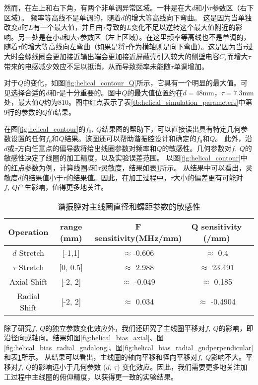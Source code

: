 然而，在左上和右下角，有两个非单调异常区域。一种是在大$d$和小$\tau$参数区（右下区域）。
频率等高线不是单调的，随着$d$的增大等高线向下弯曲。
这是因为当单独改变$d$时$L$有一个最大值，并且由$\tau$导致的$L$变化不足以逆转这个最大值附近的影响。另一处是在小$d$和大$\tau$参数区（左上区域）。在这里频率等高线也不是单调的，随着$\tau$的增大等高线向左弯曲（如果是将$\tau$作为横轴则是向下弯曲）。这是因为当$\tau$过大时会螺线圈会更加接近输出端会更加接近屏蔽壳引入较大的侧壁电容$C_s$而增大$\tau$带来的电感减少效应不足以抵消，从而导致频率未能随$\tau$单调增加。

对于$Q$的变化，如图\ref{fig:helical_contour_Q}所示，它具有一个明显的最大值。可见选择合适的$d$和$\tau$是十分重要的。图中$Q$的最大值位置约在$d=48$mm，$\tau=7.3$mm处，最大值$Q$约为$810$。图中红点表示了表\ref{tb:helical_simulation_parameters}中第9行的参数的$Q$值结果。

在图\ref{fig:helical_contour}的$ f_0,\ Q $结果图的帮助下，可以直接读出具有特定几何参数设置的任何$f_0$和$Q$结果。该图还可以帮助谐振腔设计和确定的$f_0$和$Q$。
此外，沿$d$或$\tau$方向任意点的偏导数将给出线圈参数对频率和$Q$的敏感性。几何参数对$f,\ Q$的敏感性决定了线圈的加工精度，以及实验误差范围。
以图\ref{fig:helical_contour}中的红点参数为例，计算线圈$d$和$\tau$灵敏度，结果如表\ref{tb:helical_d_tau_sensitivity}所示。
从结果中可以看出，灵敏度$d$的结果值小于$\tau$的结果值。因此，在加工过程中，$\tau$大小的偏差更有可能对 $f,\ Q$产生影响，值得更多地关注。

\begin{table}
    \centering
    \caption[谐振腔对主线圈直径和螺距参数的敏感性]{谐振腔对主线圈直径和螺距参数的敏感性\label{tb:helical_d_tau_sensitivity}}
    \begin{tabular}{ccccc}
        \toprule
        Operation & range (mm) & F sensitivity(MHz/mm) & Q sensitivity (/mm) \\
        \midrule
        $d$ Stretch & [-1,1] & $\approx$-0.606 & $\approx$ 0.4\\
        $\tau$ Stretch & [0, 0.5] & $\approx$ 2.988 & $\approx$ 23.491 \\
        Axial Shift & [-2, 2] & $\approx$ -0.049 & $\approx$ 0.185\\
        Radial Shift & [-2, 2] & $\approx$ 0.034 & $\approx$ -0.4904\\
        \bottomrule
    \end{tabular}
\end{table}

除了研究$f,\ Q$的独立参数变化效应外，我们还研究了主线圈平移对$f,\ Q$的影响，即沿径向或轴向。结果如图\ref{fig:helical_bias_axial}、图\ref{fig:helical_bias_radial_gndalong}、图\ref{fig:helical_bias_radial_gndperpendicular}和表\ref{tb:helical_d_tau_sensitivity}所示。
从结果可以看出，主线圈的轴向平移和径向平移对$f,\ Q$影响不大。平移对$f,\ Q$的影响远小于几何参数 ($d,\ \tau$) 变化效应。因此，我们需要更多地关注加工过程中主线圈的俯仰精度，以获得更一致的实验结果。

